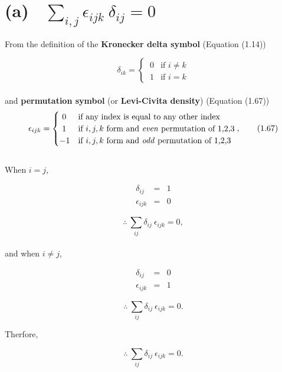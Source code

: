 \documentclass[a4paper]{article}
\begin{document}
\Large
\section*{(a)  $ {\sum\limits_{i,j}} \epsilon_{ijk} \ \delta_{ij} = 0$}

From the definition of the \textbf{Kronecker delta symbol} (Equation (1.14))

\begin{equation}
	\delta_{ik} = 
	  \begin{cases}
	  	\ 0 & \text{if } i \neq k \\
	    \ 1 & \text{if } i = k
	  \end{cases}  \tag{1.14}
\end{equation}
\\
and \textbf{permutation symbol} (or \textbf{Levi-Civita density}) (Equation (1.67))
\begin{equation}
	\epsilon_{ijk} = 
	  \begin{cases}
	  	\ 0  & \text{if any index is equal to any other index} \\
	  	\ 1  & \text{if $i,j,k$ form and \textit{even} permutation of 1,2,3}\\
	  	-1 & \text{if $i,j,k$ form and \textit{odd} permutation of 1,2,3}
	  \end{cases},  \tag{1.67}
\end{equation}
\\

When $i = j$, 

\begin{eqnarray*}
	\delta_{ij} & = & 1 \\
	\epsilon_{ijk} & = & 0
\end{eqnarray*}

\begin{equation*}
	\therefore \ \sum_{ij} \delta_{ij} \ \epsilon_{ijk} = 0,
\end{equation*}
\\
and when $i \neq j$,

\begin{eqnarray*}
	\delta_{ij} & = & 0 \\
	\epsilon_{ijk} & = & 1
\end{eqnarray*}

\begin{equation*}
	\therefore \ \sum_{ij} \delta_{ij} \ \epsilon_{ijk} = 0.
\end{equation*}

Therfore,

\begin{equation*}
	\therefore \ \sum_{ij} \delta_{ij} \ \epsilon_{ijk} = 0.
\end{equation*}
\end{document}
